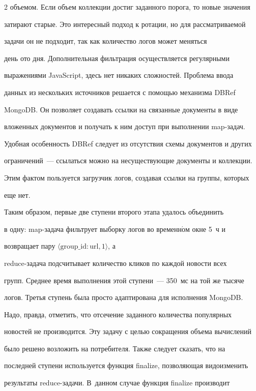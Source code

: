 \begin{multicols}{2}
объемом. Если объем коллекции достиг заданного порога, то новые значения 


затирают старые. Это интересный подход к ротации, но для рассматриваемой 


задачи он не подходит, так как количество логов может меняться


день ото дня. Дополнительная фильтрация осуществляется регулярными 


выражениями JavaScript, здесь нет никаких сложностей. Проблема ввода 


данных из нескольких источников решается с помощью механизма DBRef 


MongoDB. Он позволяет создавать ссылки на связанные документы в виде 


вложенных документов и получать к ним доступ при выполнении map-за\-дач. 


Удобная особенность DBRef следует из отсутствия схемы документов и других 


ограничений~--- ссылаться можно на несуществующие документы и коллекции. 


Этим фактом пользуется загрузчик логов, создавая ссылки на группы, которых 


еще нет. 





Таким образом, первые две ступени второго \mbox{этапа} удалось объединить 


в одну: map-за\-да\-ча фильтрует выборку логов во временн$\acute{\mbox{о}}$м окне 5~ч и 


возвращает пару $\langle\mathrm{group}\_\mathrm{id:url}, \mathrm{1}\rangle$, а 


reduce-за\-да\-ча подсчитывает количество кликов по каждой новости всех 


групп. Среднее время выполнения этой ступени~--- 350~мс на той же тысяче 


логов. Третья ступень была прос\-то адаптирована для исполнения MongoDB. 


Надо, правда, отметить, что отсечение заданного количества популярных 


новостей не производится. Эту задачу с целью сокращения объема вычислений 


было решено возложить на потребителя. Также следует сказать, что на 


последней ступени используется функция {\sf finalize}, позволяющая видоизменить 


результаты reduce-за\-да\-чи. В~данном случае функция {\sf finalize} производит 



\end{multicols}

